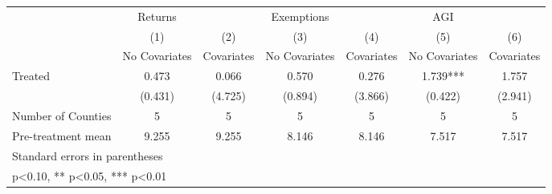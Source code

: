 {
\def\sym#1{\ifmmode^{#1}\else\(^{#1}\)\fi}
\begin{tabular}{l*{6}{c}}
\hline\hline
            &     Returns   &               &  Exemptions   &               &         AGI   &               \\
            &\multicolumn{1}{c}{(1)}&\multicolumn{1}{c}{(2)}&\multicolumn{1}{c}{(3)}&\multicolumn{1}{c}{(4)}&\multicolumn{1}{c}{(5)}&\multicolumn{1}{c}{(6)}\\
            &\multicolumn{1}{c}{No Covariates}&\multicolumn{1}{c}{Covariates}&\multicolumn{1}{c}{No Covariates}&\multicolumn{1}{c}{Covariates}&\multicolumn{1}{c}{No Covariates}&\multicolumn{1}{c}{Covariates}\\
\hline
Treated     &       0.473   &       0.066   &       0.570   &       0.276   &       1.739***&       1.757   \\
            &     (0.431)   &     (4.725)   &     (0.894)   &     (3.866)   &     (0.422)   &     (2.941)   \\
\hline
Number of Counties&           5   &           5   &           5   &           5   &           5   &           5   \\
Pre-treatment mean&       9.255   &       9.255   &       8.146   &       8.146   &       7.517   &       7.517   \\
\hline\hline
\multicolumn{7}{l}{\footnotesize Standard errors in parentheses}\\
\multicolumn{7}{l}{\footnotesize * p<0.10, ** p<0.05, *** p<0.01}\\
\end{tabular}
}
